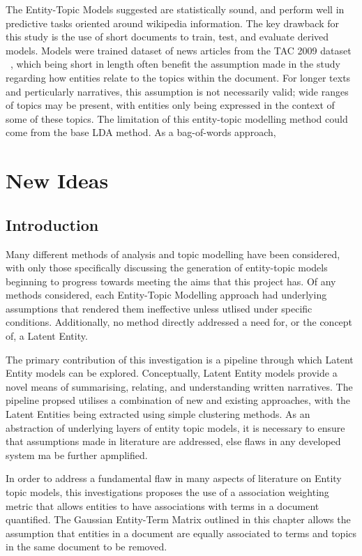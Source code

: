 \documentclass[10pt]{report}
\begin{document}
The Entity-Topic Models suggested are statistically sound, and perform well in predictive tasks oriented around wikipedia information. The key drawback for this study is the use of short documents to train, test, and evaluate derived models. Models were trained dataset of news articles from the TAC 2009 dataset ~\cite{Macnamee-pd}, which being short in length often benefit the assumption made in the study regarding how entities relate to the topics within the document. For longer texts and perticularly narratives, this assumption is not necessarily valid; wide ranges of topics may be present, with entities only being expressed in the context of some of these topics. The limitation of this entity-topic modelling method could come from the base LDA method. As a bag-of-words approach, 


%
%
%
%
\chapter{New Ideas}
\section{Introduction}
Many different methods of analysis and topic modelling have been considered, with only those specifically discussing the generation of entity-topic models beginning to progress towards meeting the aims that this project has. Of any methods considered, each Entity-Topic Modelling approach had underlying assumptions that rendered them ineffective unless utlised under specific conditions. Additionally, no method directly addressed a need for, or the concept of, a Latent Entity.

The primary contribution of this investigation is a pipeline through which Latent Entity models can be explored. Conceptually, Latent Entity models provide a novel means of summarising, relating, and understanding written narratives. The pipeline propsed utilises a combination of new and existing approaches, with the Latent Entities being extracted using simple clustering methods. As an abstraction of underlying layers of entity topic models, it is necessary to ensure that assumptions made in literature are addressed, else flaws in any developed system ma be further apmplified.

In order to address a fundamental flaw in many aspects of literature on Entity topic models, this investigations proposes the use of a association weighting metric that allows entities to have associations with terms in a document quantified. The Gaussian Entity-Term Matrix outlined in this chapter allows the assumption that entities in a document are equally associated to terms and topics in the same document to be removed.
\end{document}
